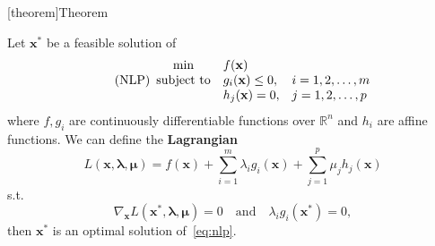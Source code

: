 \documentclass[12pt]{report}
\theoremstyle{definition}
\begin{document}
[theorem]{Theorem}
\begin{sufficiency of KKT conditions for convex problem}
    Let $\mathbf{x}^*$ be a feasible solution of
    \begin{equation}\label{eq:nlp}
        \tag{NLP}
        \begin{array}{c @{\quad} l @{\quad} l}
            \min & f(\mathbf{x}) & \\
            \text{subject to} & g_i(\mathbf{x})\le 0, & i=1,2,\ldots,m \\
                              & h_j(\mathbf{x})=0, & j=1,2,\ldots,p
        \end{array} 
    \end{equation} 
    where $f,g_i$ are continuously differentiable functions over
    $\mathbb{R}^{n}$ and $h_i$ are affine functions. We can define the
    \textbf{Lagrangian}
    \[
        L(\mathbf{x},\pmb{\lambda},\pmb{\mu})=
        f(\mathbf{x})+\sum_{i=1}^{m} \lambda_ig_i(\mathbf{x})
        +\sum_{j=1}^{p} \mu_jh_j(\mathbf{x})
    \]
    s.t.
    \[
        \nabla_\mathbf{x}L(\mathbf{x^*},\pmb{\lambda},\pmb{\mu}) = 0
        \quad\text{and}\quad
        \lambda_ig_i(\mathbf{x}^*)=0,
    \]
    then $\mathbf{x}^*$ is an optimal solution of~\eqref{eq:nlp}.
\end{sufficiency of KKT conditions for convex problem}
\end{document}
